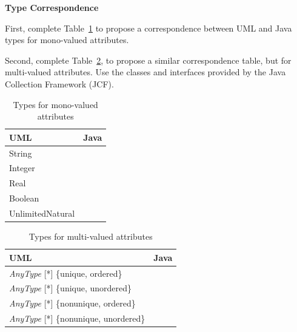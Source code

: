 \documentclass[a4paper,11pt]{memoir}
\begin{document}
\begin{exercise}\textbf{Type Correspondence}

\begin{inparaenum}[(A)]
	\item First, complete Table~\ref{tab:monovalued} to propose a correspondence between UML and Java types for mono-valued attributes.
	\item Second, complete Table~\ref{tab:multivalued}, to propose a similar correspondence table, but for multi-valued attributes. Use the classes and interfaces provided by the Java Collection Framework (JCF).
\end{inparaenum}

\begin{table}
	\begin{center}
		\begin{tabular}{p{5cm}p{5cm}}
			\toprule
			\textbf{UML} & \textbf{Java}\\
			\midrule
String   & \\
Integer  & \\
Real 	  & \\
Boolean  & \\
UnlimitedNatural & \\
			\bottomrule
		\end{tabular}
	\end{center}
	\caption{Types for mono-valued attributes}
	\label{tab:monovalued}
\end{table}



\begin{table}
	\begin{center}
		\begin{tabular}{p{7cm}p{5cm}}
			\toprule
			\textbf{UML} & \textbf{Java}\\
			\midrule
			             \emph{AnyType} [*] \{unique, ordered\}  & \\
			              \emph{AnyType} [*] \{unique, unordered\}   & \\
			              \emph{AnyType} [*] \{nonunique, ordered\}  	  & \\
						  \emph{AnyType} [*] \{nonunique, unordered\}   & \\
			\bottomrule
		\end{tabular}
			\end{center}
			\caption{Types for multi-valued attributes}
			\label{tab:multivalued}
		\end{table}
\end{exercise}
\end{document}
